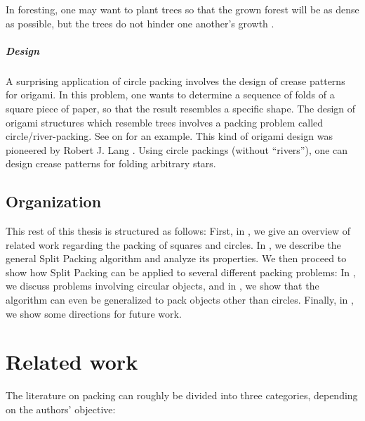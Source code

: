 \documentclass[a4paper,style=print,bibliography=totoc,nexus,lnum,extramargin]{tubsbook}
\begin{document}
In foresting, one may want to plant trees so that the grown forest will be as dense as possible, but the trees do not hinder one another's growth \cite{SMCSCG2007new}.

\paragraph{Design}

A surprising application of circle packing involves the design of crease patterns for origami. In this problem, one wants to determine a sequence of folds of a square piece of paper, so that the result resembles a specific shape. The design of origami structures which resemble trees involves a packing problem called circle/river-packing. See  on  for an example. This kind of origami design was pioneered by Robert J. Lang \cite{lang1996computational}. Using circle packings (without “rivers”), one can design crease patterns for folding arbitrary stars.

\section{Organization}

This rest of this thesis is structured as follows:
First, in \textbf{}, we give an overview of related work regarding the packing of squares and circles.
In \textbf{}, we describe the general Split Packing algorithm and analyze its properties.
We then proceed to show how Split Packing can be applied to several different packing problems: In \textbf{}, we discuss problems involving circular objects, and in \textbf{}, we show that the algorithm can even be generalized to pack objects other than circles.
Finally, in \textbf{}, we show some directions for future work.

\chapter{Related work}\label{ch:related-work}

The literature on packing can roughly be divided into three categories, depending on the authors' objective:
\end{document}

